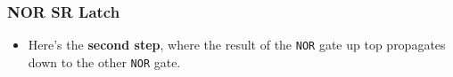 \documentclass{beamer}
\begin{document}
   		\begin{frame}
   			\frametitle{NOR SR Latch}
   			\begin{itemize}
   				\item Here's the \textbf{second step}, where the result of the \texttt{NOR} gate up top propagates down to the other \texttt{NOR} gate.
   			\end{itemize}
   			
   			{
   			\centering
   			


\begin{tikzpicture}[x=0.75pt,y=0.75pt,yscale=-1,xscale=1]


\end{tikzpicture}}
\end{frame}
\end{document}
